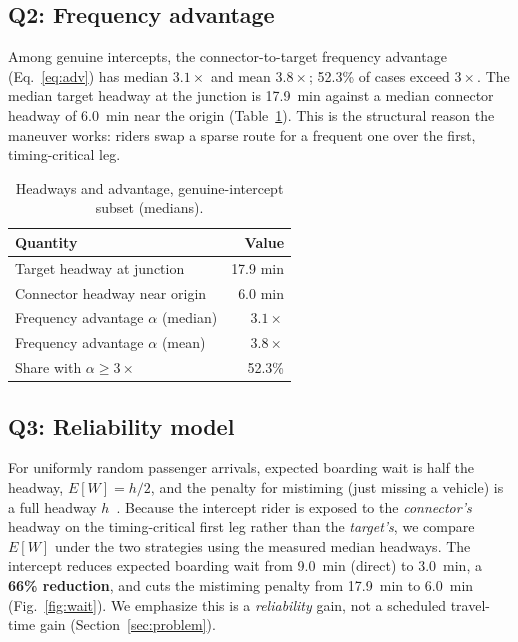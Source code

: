 \documentclass[conference]{IEEEtran}
\begin{document}
\subsection{Q2: Frequency advantage}
Among genuine intercepts, the connector-to-target frequency advantage
(Eq.~\ref{eq:adv}) has median $3.1\times$ and mean $3.8\times$; 52.3\% of cases
exceed $3\times$. The median target headway at the junction is 17.9~min against a
median connector headway of 6.0~min near the origin (Table~\ref{tab:head}). This
is the structural reason the maneuver works: riders swap a sparse route for a
frequent one over the first, timing-critical leg.

\begin{table}[t]
\caption{Headways and advantage, genuine-intercept subset (medians).}
\label{tab:head}
\centering
\begin{tabular}{lr}
\toprule
\textbf{Quantity} & \textbf{Value} \\
\midrule
Target headway at junction          & 17.9 min \\
Connector headway near origin       & 6.0 min \\
Frequency advantage $\alpha$ (median) & $3.1\times$ \\
Frequency advantage $\alpha$ (mean)   & $3.8\times$ \\
Share with $\alpha \ge 3\times$       & 52.3\% \\
\bottomrule
\end{tabular}
\end{table}

\subsection{Q3: Reliability model}
For uniformly random passenger arrivals, expected boarding wait is half the
headway, $E[W]=h/2$, and the penalty for mistiming (just missing a vehicle) is a
full headway $h$~\cite{welding1957,larson1981}. Because the intercept rider is
exposed to the \emph{connector's} headway on the timing-critical first leg rather
than the \emph{target's}, we compare $E[W]$ under the two strategies using the
measured median headways. The intercept reduces expected boarding wait from
9.0~min (direct) to 3.0~min, a \textbf{66\% reduction}, and cuts the mistiming
penalty from 17.9~min to 6.0~min (Fig.~\ref{fig:wait}). We emphasize this is a
\emph{reliability} gain, not a scheduled travel-time gain
(Section~\ref{sec:problem}).
\end{document}
